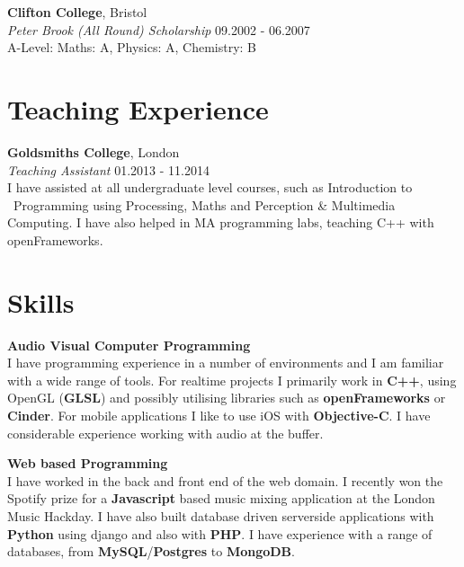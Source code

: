 \documentclass[margin,line,a4paper]{resume}
\begin{document}
\begin{resume}
\textbf{Clifton College}, Bristol \vspace{0.5mm}\\
\textsl{Peter Brook (All Round) Scholarship} \hfill 09.2002 - 06.2007 \vspace{0.5mm} \\
A-Level: Maths: A, Physics: A, Chemistry: B


\section{\mysidestyle Teaching Experience}

\textbf{Goldsmiths College}, London \vspace{1mm}\\
\textsl{Teaching Assistant} \hfill 01.2013 - 11.2014 \vspace{2mm} \\
I have assisted at all undergraduate level courses, such as Introduction to \ Programming using Processing, Maths and Perception \& Multimedia Computing. I have also helped in  MA programming labs, teaching C++ with openFrameworks.


\section{\mysidestyle Skills}

\textbf{Audio Visual Computer Programming} \vspace{1mm} \\
I have programming experience in a number of environments and I am
familiar with a wide range of tools. For realtime projects I primarily work in
\textbf{C++}, using OpenGL (\textbf{GLSL}) and possibly utilising
libraries such as \textbf{openFrameworks} or \textbf{Cinder}. For mobile applications I like to use iOS with \textbf{Objective-C}.  I have considerable experience working with audio at the buffer.

\textbf{Web based Programming} \vspace{1mm} \\
I have worked in the back and front end of the web domain. I recently won the Spotify prize for a \textbf{Javascript} based music mixing application at the London Music Hackday. I have also built database driven serverside applications with \textbf{Python} using django and also with \textbf{PHP}. I have experience with a range of databases, from \textbf{MySQL}/\textbf{Postgres} to \textbf{MongoDB}.


\end{resume}
\end{document}
